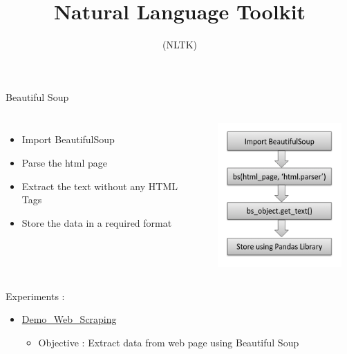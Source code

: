 \documentclass[aspectratio=169,12pt]{beamer}
\begin{document}
\begin{frame}{Beautiful Soup​}
\begin{columns}

\begin{itemize}
\itemsep1em 
\item Import BeautifulSoup
\item Parse the html page
\item Extract the text without any HTML Tags
\item  Store the data in a required format
\end{itemize}
	\begin{flushright}
		\includegraphics[width=6cm,  height=5.5cm]{Images/AIML_WS_IMG3.png}
	\end{flushright}

\end{columns}
\end{frame}

\begin{frame}{Experiments : }
\begin{itemize}
\item \href{https://drive.google.com/file/d/1MY9I-HIv906SL2TKUZ_kNDvxhlTH1Mzu/view?usp=sharing}{Demo\_Web\_Scraping} 
	\begin{itemize}
		\item Objective :  Extract data from web page using Beautiful Soup
	\end{itemize}

\end{itemize}
\end{frame}

{\1
\begin{frame}
\title{Natural Language Toolkit}
\subtitle{(NLTK)}
  \titlepage
\end{frame}
}
\end{document}
